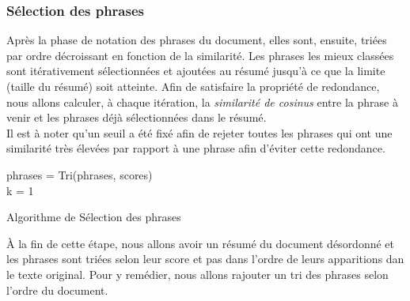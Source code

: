         \subsubsection{Sélection des phrases}
       Après la phase de notation des phrases du document, elles sont, ensuite, triées par ordre décroissant en fonction de la similarité. Les phrases les mieux classées sont itérativement sélectionnées et ajoutées au résumé jusqu'à ce que la limite (taille du résumé) soit atteinte. Afin de satisfaire la propriété de redondance, nous allons calculer, à chaque itération, la \emph{similarité de cosinus} entre la phrase à venir et les phrases déjà sélectionnées dans le résumé.\\
       Il est à noter qu'un seuil a été fixé afin de rejeter toutes les phrases qui ont une similarité très élevées par rapport à une phrase afin d'éviter cette redondance.
        \begin{algorithm2e}[H]
            \SetAlgoLined
            phrases = Tri(phrases, scores)\\
            k = 1\\
            \caption{Algorithme de Sélection des phrases}
        \end{algorithm2e}

        À la fin de cette étape, nous allons avoir un résumé du document désordonné et les phrases sont triées selon leur score et pas dans l'ordre de leurs apparitions dan le texte original. Pour y remédier, nous allons rajouter un tri des phrases selon l'ordre du document.
        
